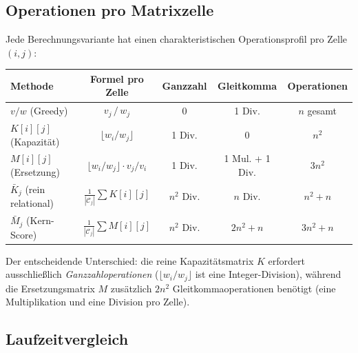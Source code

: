 \documentclass[a4paper,11pt]{article}
\begin{document}
\subsection{Operationen pro Matrixzelle}

Jede Berechnungsvariante hat einen charakteristischen
Operationsprofil pro Zelle $(i,j)$:

\begin{center}
\renewcommand{\arraystretch}{1.3}
\begin{tabular}{lcccc}
\toprule
Methode & Formel pro Zelle
  & Ganzzahl & Gleitkomma & Operationen \\
\midrule
$v/w$ (Greedy)
  & $v_j \,/\, w_j$
  & 0 & 1 Div. & $n$ gesamt \\[2pt]
$K[i][j]$ (Kapazität)
  & $\lfloor w_i / w_j \rfloor$
  & 1 Div. & 0 & $n^2$ \\[2pt]
$M[i][j]$ (Ersetzung)
  & $\lfloor w_i/w_j \rfloor \cdot v_j/v_i$
  & 1 Div. & 1 Mul. + 1 Div. & $3n^2$ \\[2pt]
$\bar{K}_j$ (rein relational)
  & $\frac{1}{|\mathcal{C}_j|} \sum K[i][j]$
  & $n^2$ Div. & $n$ Div. & $n^2 + n$ \\[2pt]
$\bar{M}_j$ (Kern-Score)
  & $\frac{1}{|\mathcal{C}_j|} \sum M[i][j]$
  & $n^2$ Div. & $2n^2 + n$ & $3n^2 + n$ \\
\bottomrule
\end{tabular}
\end{center}

\noindent
Der entscheidende Unterschied: die reine Kapazitätsmatrix $K$
erfordert ausschließlich \emph{Ganzzahloperationen}
($\lfloor w_i/w_j \rfloor$ ist eine Integer-Division), während
die Ersetzungsmatrix $M$ zusätzlich $2n^2$ Gleitkommaoperationen
benötigt (eine Multiplikation und eine Division pro Zelle).

\subsection{Laufzeitvergleich}

\begin{center}
\end{center}
\end{document}
